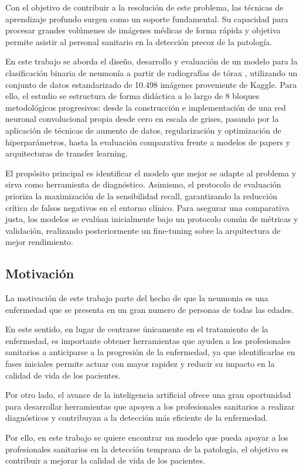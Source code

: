\documentclass[11pt, a4paper]{article}
\numberwithin{equation}{section}
\begin{document}
Con el objetivo de contribuir a la resolución de este problema, las técnicas de aprendizaje profundo surgen como un soporte fundamental. Su capacidad para procesar grandes volúmenes de imágenes médicas de forma rápida y objetiva permite asistir al personal sanitario en la detección precoz de la patología.

En este trabajo se aborda el diseño, desarrollo y evaluación de un modelo para la clasificación binaria de neumonía a partir de radiografías de tórax , utilizando un conjunto de datos estandarizado de 10.498 imágenes proveniente de Kaggle. Para ello, el estudio se estructura de forma didáctica a lo largo de 8 bloques metodológicos progresivos: desde la construcción e implementación de una red neuronal convolucional  propia desde cero en escala de grises, pasando por la aplicación de técnicas de aumento de datos, regularización y optimización de hiperparámetros, hasta la evaluación comparativa frente a modelos de papers y arquitecturas de transfer learning.

El propósito principal es identificar el modelo que mejor se adapte al problema y sirva como herramienta de diagnóstico. Asimismo, el protocolo de evaluación prioriza la maximización de la sensibilidad recall, garantizando la reducción crítica de falsos negativos en el entorno clínico. Para asegurar una comparativa justa, los modelos se evalúan inicialmente bajo un protocolo común de métricas y validación, realizando posteriormente un fine-tuning sobre la arquitectura de mejor rendimiento.
\subsection{Motivación}
La motivación de este trabajo parte del hecho de que la neumonia es una enfermedad que se presenta en un gran numero de personas de todas las edades.

En este sentido, en lugar de centrarse únicamente en el tratamiento de la enfermedad, es importante obtener herramientas que ayuden a los profesionales sanitarios a anticiparse a la progresión de la enfermedad, ya que identificarlas en fases iniciales permite actuar con mayor rapidez y reducir su impacto en la calidad de vida de los pacientes.

Por otro lado, el avance de la inteligencia artificial ofrece una gran oportunidad para desarrollar herramientas que apoyen a los profesionales sanitarios a realizar diagnósticos y contribuyan a la detección más eficiente de la enfermedad.

Por ello, en este trabajo se quiere encontrar un modelo que pueda apoyar a los profesionales sanitarios en la detección temprana de la patología, el objetivo es contribuir a mejorar la calidad de vida de los pacientes.
\end{document}
